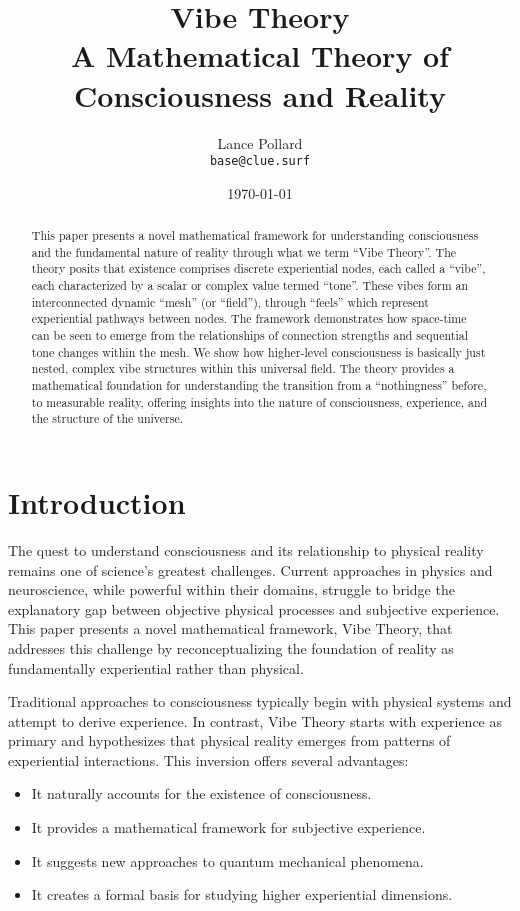 \documentclass{article}
\title{
  {\huge \textbf{Vibe Theory}} \\ %
  \large A Mathematical Theory of Consciousness and Reality
}
\author{Lance Pollard \\ \texttt{base@clue.surf}}
\date{\today}
\date{}
\theoremstyle{definition}
\theoremstyle{axiom}
\theoremstyle{theorem}
\theoremstyle{proposition}
\begin{document}
\maketitle

\begin{abstract}
This paper presents a novel mathematical framework for understanding consciousness and the fundamental nature of reality through what we term \enquote{Vibe Theory}. The theory posits that existence comprises discrete experiential nodes, each called a \enquote{vibe}, each characterized by a scalar or complex value termed \enquote{tone}. These vibes form an interconnected dynamic \enquote{mesh} (or \enquote{field}), through \enquote{feels} which represent experiential pathways between nodes. The framework demonstrates how space-time can be seen to emerge from the relationships of connection strengths and sequential tone changes within the mesh. We show how higher-level consciousness is basically just nested, complex vibe structures within this universal field. The theory provides a mathematical foundation for understanding the transition from a \enquote{nothingness} before, to measurable reality, offering insights into the nature of consciousness, experience, and the structure of the universe.
\end{abstract}
\section{Introduction}

The quest to understand consciousness and its relationship to physical reality remains one of science's greatest challenges. Current approaches in physics and neuroscience, while powerful within their domains, struggle to bridge the explanatory gap between objective physical processes and subjective experience. This paper presents a novel mathematical framework, Vibe Theory, that addresses this challenge by reconceptualizing the foundation of reality as fundamentally experiential rather than physical.

Traditional approaches to consciousness typically begin with physical systems and attempt to derive experience. In contrast, Vibe Theory starts with experience as primary and hypothesizes that physical reality emerges from patterns of experiential interactions. This inversion offers several advantages:

\begin{itemize}
\item It naturally accounts for the existence of consciousness.
\item It provides a mathematical framework for subjective experience.
\item It suggests new approaches to quantum mechanical phenomena.
\item It creates a formal basis for studying higher experiential dimensions.
\end{itemize}
\end{document}
